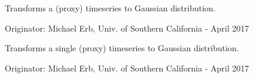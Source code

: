 \documentclass[letterpaper,10pt,english]{sphinxmanual}
\begin{document}

\begin{fulllineitems}
\label{\detokenize{Timeseries:pyleoclim.Timeseries.gaussianize}}
Transforms a (proxy) timeseries to Gaussian distribution.

Originator: Michael Erb, Univ. of Southern California - April 2017

\end{fulllineitems}


\begin{fulllineitems}
\label{\detokenize{Timeseries:pyleoclim.Timeseries.gaussianize_single}}
Transforms a single (proxy) timeseries to Gaussian distribution.

Originator: Michael Erb, Univ. of Southern California - April 2017

\end{fulllineitems}

\end{document}
